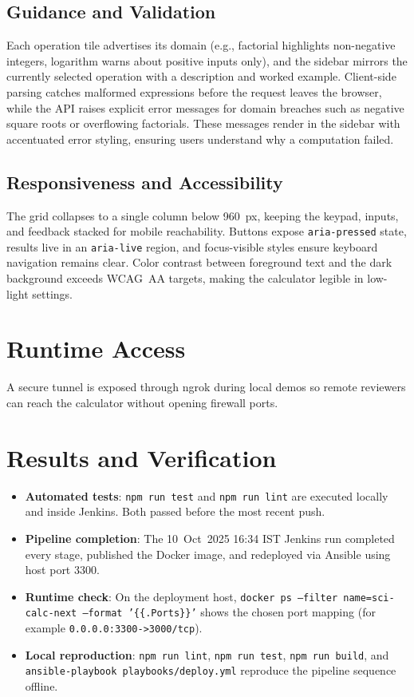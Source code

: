 \documentclass[12pt]{article}
\begin{document}
\subsection*{Guidance and Validation}
Each operation tile advertises its domain (e.g., factorial highlights non-negative integers, logarithm warns about positive inputs only), and the sidebar mirrors the currently selected operation with a description and worked example. Client-side parsing catches malformed expressions before the request leaves the browser, while the API raises explicit error messages for domain breaches such as negative square roots or overflowing factorials. These messages render in the sidebar with accentuated error styling, ensuring users understand why a computation failed.

\subsection*{Responsiveness and Accessibility}
The grid collapses to a single column below 960~px, keeping the keypad, inputs, and feedback stacked for mobile reachability. Buttons expose \texttt{aria-pressed} state, results live in an \texttt{aria-live} region, and focus-visible styles ensure keyboard navigation remains clear. Color contrast between foreground text and the dark background exceeds WCAG~AA targets, making the calculator legible in low-light settings.
\section{Runtime Access}
A secure tunnel is exposed through ngrok during local demos so remote reviewers can reach the calculator without opening firewall ports.

\section{Results and Verification}
\begin{itemize}[leftmargin=*]
  \item \textbf{Automated tests}: \texttt{npm run test} and \texttt{npm run lint} are executed locally and inside Jenkins. Both passed before the most recent push.
  \item \textbf{Pipeline completion}: The 10~Oct~2025 16:34 IST Jenkins run completed every stage, published the Docker image, and redeployed via Ansible using host port 3300.
  \item \textbf{Runtime check}: On the deployment host, \texttt{docker ps --filter name=sci-calc-next --format '{\{\{.Ports\}\}}'} shows the chosen port mapping (for example \texttt{0.0.0.0:3300->3000/tcp}).
  \item \textbf{Local reproduction}: \texttt{npm run lint}, \texttt{npm run test}, \texttt{npm run build}, and \texttt{ansible-playbook playbooks/deploy.yml} reproduce the pipeline sequence offline.
\end{itemize}
\end{document}
